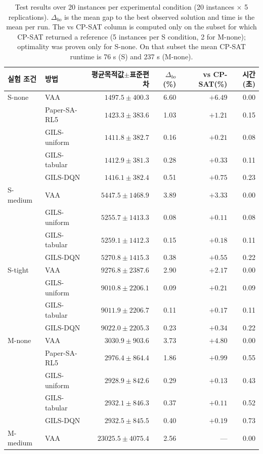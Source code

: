 \documentclass[10pt,a4paper]{article}
\begin{document}
\begin{table}[t]\centering
\caption{Test results over 20 instances per experimental condition (20 instances $\times$ 5 replications). $\Delta_{bo}$ is the mean gap to the best observed solution and time is the mean per run. The vs CP-SAT column is computed only on the subset for which CP-SAT returned a reference (5 instances per S condition, 2 for M-none); optimality was proven only for S-none. On that subset the mean CP-SAT runtime is 76 s (S) and 237 s (M-none).}\label{tab:main}\small
\begin{tabular}{@{}llrrrr@{}}
\toprule
실험 조건 & 방법 & 평균목적값$\pm$표준편차 & $\Delta_{bo}$(\%) & vs CP-SAT(\%) & 시간(초)\\
\midrule
S-none & VAA & $1497.5\pm400.3$ & 6.60 & $+6.49$ & 0.00\\
 & Paper-SA-RL5 & $1423.3\pm383.6$ & 1.03 & $+1.21$ & 0.15\\
 & GILS-uniform & $1411.8\pm382.7$ & 0.16 & $+0.21$ & 0.08\\
 & GILS-tabular & $1412.9\pm381.3$ & 0.28 & $+0.33$ & 0.11\\
 & GILS-DQN & $1416.1\pm382.4$ & 0.51 & $+0.75$ & 0.23\\
S-medium & VAA & $5447.5\pm1468.9$ & 3.89 & $+3.33$ & 0.00\\
 & GILS-uniform & $5255.7\pm1413.3$ & 0.08 & $+0.11$ & 0.08\\
 & GILS-tabular & $5259.1\pm1412.3$ & 0.15 & $+0.18$ & 0.11\\
 & GILS-DQN & $5270.8\pm1415.3$ & 0.38 & $+0.55$ & 0.22\\
S-tight & VAA & $9276.8\pm2387.6$ & 2.90 & $+2.17$ & 0.00\\
 & GILS-uniform & $9010.8\pm2206.1$ & 0.09 & $+0.21$ & 0.09\\
 & GILS-tabular & $9011.9\pm2206.7$ & 0.11 & $+0.17$ & 0.11\\
 & GILS-DQN & $9022.0\pm2205.3$ & 0.23 & $+0.34$ & 0.22\\
M-none & VAA & $3030.9\pm903.6$ & 3.73 & $+4.80$ & 0.00\\
 & Paper-SA-RL5 & $2976.4\pm864.4$ & 1.86 & $+0.99$ & 0.55\\
 & GILS-uniform & $2928.9\pm842.6$ & 0.29 & $+0.13$ & 0.43\\
 & GILS-tabular & $2932.1\pm846.3$ & 0.37 & $+0.11$ & 0.52\\
 & GILS-DQN & $2932.5\pm845.5$ & 0.40 & $+0.19$ & 0.73\\
M-medium & VAA & $23025.5\pm4075.4$ & 2.56 & --- & 0.00\\

\end{tabular}
\end{table}
\end{document}
